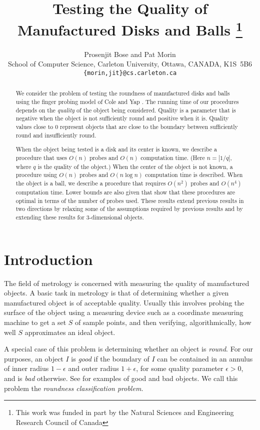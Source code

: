 \documentclass[11pt]{article}
\title{Testing the Quality of
	Manufactured Disks and Balls%
	\thanks{This work was funded in part by the Natural
	Sciences and Engineering Research Council of Canada}}
\author{Prosenjit Bose and Pat Morin \\ School of Computer Science, 
	Carleton University, Ottawa, CANADA, K1S~5B6 \\
	\texttt{\{morin,jit\}@cs.carleton.ca}}
\date{}
\begin{document}
\maketitle

\begin{abstract}
We consider the problem of testing the roundness of manufactured disks
and balls using the finger probing model of Cole and Yap \cite{cy87}.
The running time of our procedures depends on the \emph{quality} of
the object being considered.  Quality is a parameter that is negative
when the object is not sufficiently round and positive when it is.
Quality values close to 0 represent objects that are close to the
boundary between sufficiently round and insufficiently round.

When the object being tested is a disk and its center is known, we
describe a procedure that uses $O(n)$ probes and $O(n)$ computation
time. (Here $n=|1/q|$, where $q$ is the quality of the object.)  When
the center of the object is not known, a procedure using $O(n)$ probes
and $O(n\log n)$ computation time is described.  When the object is a
ball, we describe a procedure that requires $O(n^2)$ probes and
$O(n^4)$ computation time.  Lower bounds are also given that show
that these procedures are optimal in terms of the number of probes
used.  These results extend previous results in two directions by
relaxing some of the assumptions required by previous results and by
extending these results for 3-dimensional objects.
\end{abstract}

\section{Introduction}

The field of metrology is concerned with measuring the quality of
manufactured objects.  A basic task in metrology is that of
determining whether a given manufactured object is of acceptable
quality.  Usually this involves probing the surface of the object
using a measuring device such as a coordinate measuring machine to get
a set $S$ of sample points, and then verifying, algorithmically, how
well $S$ approximates an ideal object.

A special case of this problem is determining whether an object is
\emph{round}.  For our purposes, an object $I$ is \emph{good} if the
boundary of $I$ can be contained in an annulus of inner radius
$1-\epsilon$ and outer radius $1+\epsilon$, for some quality parameter
$\epsilon > 0$, and is \emph{bad} otherwise.  See  for
examples of good and bad objects.  We call this problem the {\em
roundness classification problem.}
\end{document}
